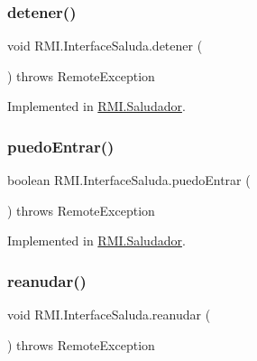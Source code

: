 \subsubsection{\texorpdfstring{detener()}{detener()}}
{\footnotesize\ttfamily void R\+M\+I.\+Interface\+Saluda.\+detener (\begin{DoxyParamCaption}{ }\end{DoxyParamCaption}) throws Remote\+Exception}



Implemented in \mbox{\hyperlink{class_r_m_i_1_1_saludador_a0d92560cbe25dfcfc18c73dfd3295fa4}{R\+M\+I.\+Saludador}}.

\mbox{\label{interface_r_m_i_1_1_interface_saluda_afbc3db469b848c5a90bbf10ebc20823f}} 
\subsubsection{\texorpdfstring{puedo\+Entrar()}{puedoEntrar()}}
{\footnotesize\ttfamily boolean R\+M\+I.\+Interface\+Saluda.\+puedo\+Entrar (\begin{DoxyParamCaption}{ }\end{DoxyParamCaption}) throws Remote\+Exception}



Implemented in \mbox{\hyperlink{class_r_m_i_1_1_saludador_a1fc26b10a1968a3d7080adf3acf37718}{R\+M\+I.\+Saludador}}.

\mbox{\label{interface_r_m_i_1_1_interface_saluda_a8d97c9155ed6c35d8691263d1b70000a}} 
\subsubsection{\texorpdfstring{reanudar()}{reanudar()}}
{\footnotesize\ttfamily void R\+M\+I.\+Interface\+Saluda.\+reanudar (\begin{DoxyParamCaption}{ }\end{DoxyParamCaption}) throws Remote\+Exception}



